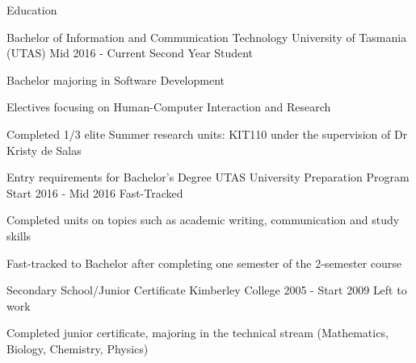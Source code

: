 \begin{tmrsection}{Education}

\tmrlistentry
    {Bachelor of Information and Communication Technology}
    {University of Tasmania (UTAS)}
    {Mid 2016 - Current}
    {Second Year Student}
    {\item Bachelor majoring in Software Development
    	\item Electives focusing on Human-Computer Interaction and Research 
    	\item Completed 1/3 elite Summer research units: KIT110 under the supervision of Dr Kristy de Salas}
    
\tmrlistentry
    {Entry requirements for Bachelor's Degree}
    {UTAS University Preparation Program}
    {Start 2016 - Mid 2016}
    {Fast-Tracked}
    {\item Completed units on topics such as academic writing, communication and study skills
		\item Fast-tracked to Bachelor after completing one semester of the 2-semester course}
    
\tmrlistentry
    {Secondary School/Junior Certificate}
	{Kimberley College}
	{2005 - Start 2009}
	{Left to work}
	{\item Completed junior certificate, majoring in the technical stream (Mathematics, Biology, Chemistry, Physics)}
	
\end{tmrsection}